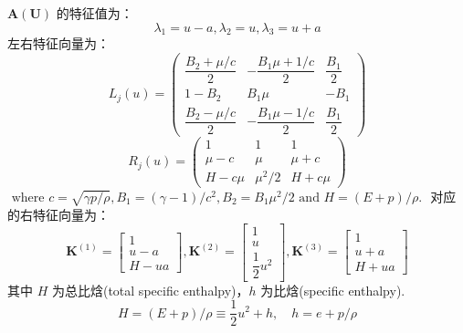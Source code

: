 \documentclass{article}
\numberwithin{equation}{subsection}    %
\begin{document}
\begin{appendix}
    $\mathbf{A}(\mathbf{U})$ 的特征值为：
    \begin{equation}
        \lambda_{1}=u-a, \lambda_{2}=u, \lambda_{3}=u+a
    \end{equation}
    左右特征向量为\cite{RN95}：
    \begin{equation}
        L_{j}(u)=\left(\begin{array}{ccc}
                \dfrac{B_{2}+\mu / c}{2} & -\dfrac{B_{1} \mu+1 / c}{2} & \dfrac{B_{1}}{2} \\
                1-B_{2}                  & B_{1} \mu                   & -B_{1}           \\
                \dfrac{B_{2}-\mu / c}{2} & -\dfrac{B_{1} \mu-1 / c}{2} & \dfrac{B_{1}}{2}
            \end{array}\right)
    \end{equation}
    \begin{equation}
        R_{j}(u)=\left(\begin{array}{ccc}
                1       & 1           & 1       \\
                \mu-c   & \mu         & \mu+c   \\
                H-c \mu & \mu^{2} / 2 & H+c \mu
            \end{array}\right)
    \end{equation}
    $\text { where } c=\sqrt{\gamma p / \rho}, B_{1}=(\gamma-1) / c^{2}, B_{2}=B_{1} \mu^{2} / 2 \text { and } H=(E+p) / \rho \text {. }$
    对应的右特征向量为：
    \begin{equation}
        \mathbf{K}^{(1)}=\left[\begin{array}{c}
                1   \\
                u-a \\
                H-u a
            \end{array}\right], \mathbf{K}^{(2)}=\left[\begin{array}{c}
                1 \\
                u \\
                \dfrac{1}{2} u^{2}
            \end{array}\right], \mathbf{K}^{(3)}=\left[\begin{array}{c}
                1   \\
                u+a \\
                H+u a
            \end{array}\right]
    \end{equation}
    其中 $H$ 为总比焓(total specific enthalpy)，$h$ 为比焓(specific enthalpy).
    \begin{equation}
        H=(E+p) / \rho \equiv \dfrac{1}{2} u^{2}+h, \quad h=e+p / \rho
    \end{equation}

\end{appendix}
\end{document}
